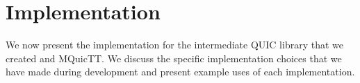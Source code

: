 \chapter{Implementation} \label{chap:impl}

We now present the implementation for the intermediate QUIC library that we created and MQuicTT.
We discuss the specific implementation choices that we have made during development and present example uses of each implementation.


